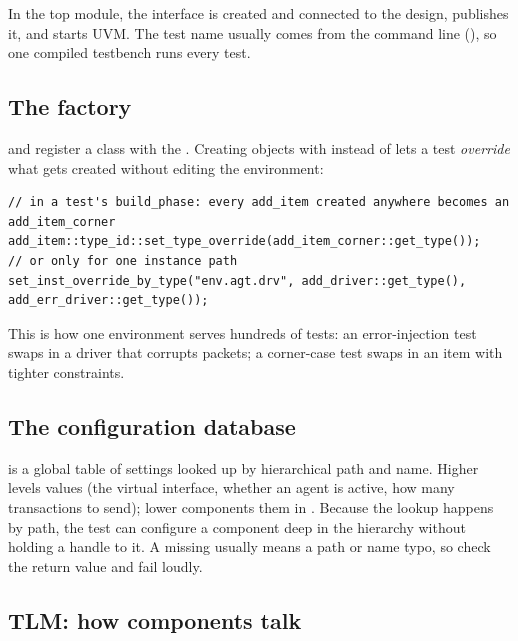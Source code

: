 In the top module, the interface is created and connected to the design,  publishes it, and  starts UVM. The test name usually comes from the command line (), so one compiled testbench runs every test.

\subsection*{The factory}

 and  register a class with the . Creating objects with  instead of  lets a test \emph{override} what gets created without editing the environment:

\begin{lstlisting}
// in a test's build_phase: every add_item created anywhere becomes an add_item_corner
add_item::type_id::set_type_override(add_item_corner::get_type());
// or only for one instance path
set_inst_override_by_type("env.agt.drv", add_driver::get_type(), add_err_driver::get_type());
\end{lstlisting}

This is how one environment serves hundreds of tests: an error-injection test swaps in a driver that corrupts packets; a corner-case test swaps in an item with tighter constraints.

\subsection*{The configuration database}

 is a global table of settings looked up by hierarchical path and name. Higher levels  values (the virtual interface, whether an agent is active, how many transactions to send); lower components  them in . Because the lookup happens by path, the test can configure a component deep in the hierarchy without holding a handle to it. A missing  usually means a path or name typo, so check the return value and fail loudly.

\subsection*{TLM: how components talk}

